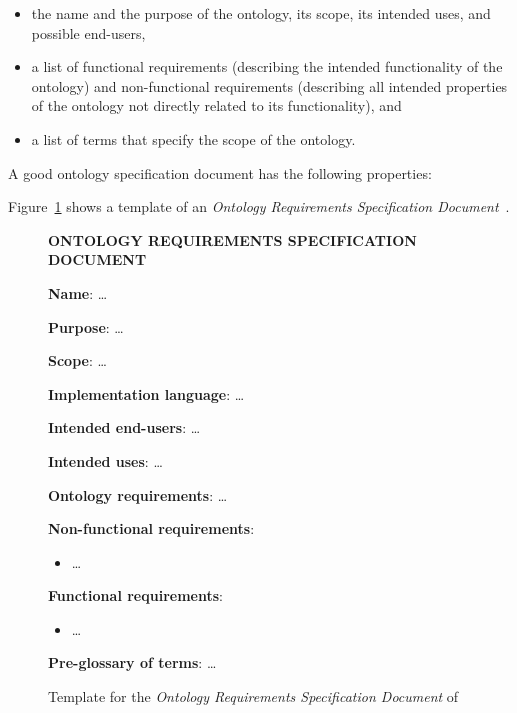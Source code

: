 \begin{itemize}
  \item the name and the purpose of the ontology, its scope, its intended uses, and possible end-users,
  \item a list of functional requirements (describing the intended functionality of the ontology) and non-functional requirements (describing all intended properties of the ontology not directly related to its functionality), and
  \item a list of terms that specify the scope of the ontology.
\end{itemize}

A good ontology specification document has the following properties:

Figure~\ref{fig:ontology_specification_template} shows a template of an \emph{Ontology Requirements Specification Document}~\cite{ORSD}.

\begin{figure}
\begin{mdframed}[linewidth=.6pt]
\setlength{\parindent}{0pt}
\MakeUppercase{\textbf{Ontology Requirements Specification Document}}

\textbf{Name}: …

\textbf{Purpose}: …

\textbf{Scope}: …

\textbf{Implementation language}: …

\textbf{Intended end-users}: …

\textbf{Intended uses}: …

\textbf{Ontology requirements}: …

\setlength{\leftskip}{.5cm}

\textbf{Non-functional requirements}: 

\begin{itemize}
  \item …
\end{itemize}

\textbf{Functional requirements}: 

\begin{itemize}
  \item …
\end{itemize}

\setlength{\leftskip}{0cm}

\textbf{Pre-glossary of terms}: …

\end{mdframed}

\caption{Template for the \emph{Ontology Requirements Specification Document} of \methontology~\cite{ORSD}}
\label{fig:ontology_specification_template}
\end{figure}

